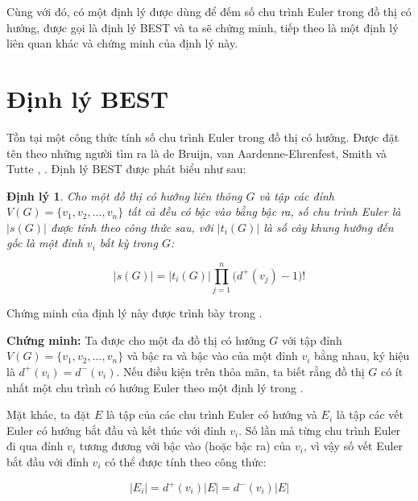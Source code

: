 \documentclass[14pt, a4paper]{article}
\numberwithin{equation}{section}
\numberwithin{figure}{section}
\newtheorem{dl}{Định lý}
\numberwithin{dl}{section}
\numberwithin{md}{section}
\numberwithin{bd}{section}
\numberwithin{dn}{section}
\numberwithin{hq}{section}
\begin{document}
    Cùng với đó, có một định lý được dùng để đếm số chu trình Euler trong đồ thị có hướng, được gọi là định lý BEST và ta sẽ chứng minh, tiếp theo là một định lý liên quan khác và chứng minh của định lý này.

    \section{Định lý BEST}

    Tồn tại một công thức tính số chu trình Euler trong đồ thị có hướng.
    Được đặt tên theo những người tìm ra là de Bruijn, van Aardenne-Ehrenfest, Smith và Tutte \cite{van1951circuits}, \cite{tutte1941unicursal}.
    Định lý BEST được phát biểu như sau:

    \begin{dl}
        Cho một đồ thị có hướng liên thông $G$ và tập các đỉnh $V(G)=\lbrace v_1, v_2, \dots, v_n \rbrace$ tất cả đều có bậc vào bằng bậc ra, số chu trình Euler là $\lvert s(G) \rvert$ được tính theo công thức sau, với $\lvert t_i (G) \rvert$ là số cây khung hướng đến gốc là một đỉnh $v_i$ bất kỳ trong $G$:

        \begin{equation*}
            \lvert s(G) \rvert = \lvert t_i (G) \rvert \prod_{j=1}^n \big( d^+ (v_j) - 1 \big)!
        \end{equation*}
    \end{dl}

    Chứng minh của định lý này được trình bày trong \cite{bollobas1998graduate}.

    \textbf{Chứng minh:}
    Ta được cho một đa đồ thị có hướng $G$ với tập đỉnh $V(G)=\lbrace v_1, v_2, \dots, v_n \rbrace$ và bậc ra và bậc vào của một đỉnh $v_i$ bằng nhau, ký hiệu là $d^+ (v_i) = d^- (v_i)$.
    Nếu điều kiện trên thỏa mãn, ta biết rằng đồ thị $G$ có ít nhất một chu trình có hướng Euler theo một định lý trong \cite{bollobas1998graduate}.

    Mặt khác, ta đặt $E$ là tập của các chu trình Euler có hướng và $E_i$ là tập các vết Euler có hướng bắt đầu và kết thúc với đỉnh $v_i$.
    Số lần mà từng chu trình Euler đi qua đỉnh $v_i$ tương đương với bậc vào (hoặc bậc ra) của $v_i$, vì vậy số vết Euler bắt đầu với đỉnh $v_i$ có thể được tính theo công thức:

    \begin{equation}
        \lvert E_i \rvert = d^+ (v_i) \lvert E \rvert = d^- (v_i) \lvert E \rvert
    \end{equation}
\end{document}
